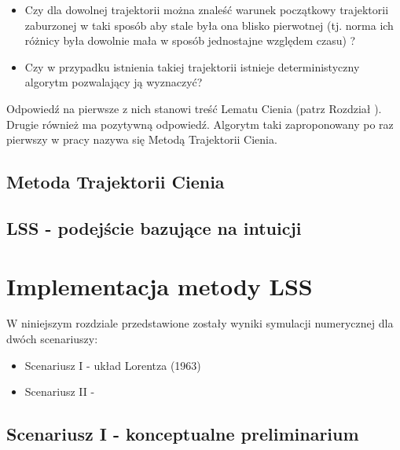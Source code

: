 \documentclass[12pt]{article}
\begin{document}
\begin{itemize}
	\item Czy dla dowolnej trajektorii można znaleść warunek początkowy trajektorii zaburzonej w taki sposób aby stale była ona blisko pierwotnej (tj. norma ich różnicy była dowolnie mała w sposób jednostajne względem czasu) ?
	\item Czy w przypadku istnienia takiej trajektorii istnieje deterministyczny algorytm pozwalający ją wyznaczyć?
\end{itemize} 
Odpowiedź na pierwsze z nich stanowi treść Lematu Cienia (patrz Rozdział ). Drugie również ma pozytywną odpowiedź. Algorytm taki zaproponowany po raz pierwszy w pracy \cite{Qiqi2} nazywa się Metodą Trajektorii Cienia.
\subsection{Metoda Trajektorii Cienia} 

\subsection{LSS - podejście bazujące na intuicji}
\newpage
\section{Implementacja metody LSS}
W niniejszym rozdziale przedstawione zostały wyniki symulacji numerycznej dla dwóch scenariuszy:
\begin{itemize}
	\item Scenariusz I - układ Lorentza (1963)
	\item Scenariusz II - 
\end{itemize}
\subsection{Scenariusz I - konceptualne preliminarium}
\end{document}
